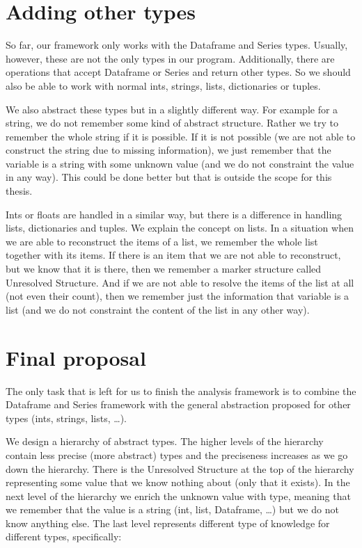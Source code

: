 \section{Adding other types}

So far, our framework only works with the Dataframe and Series types.
Usually, however, these are not the only types in our program.
Additionally, there are operations that accept Dataframe or Series and return other types.
So we should also be able to work with normal ints, strings, lists, dictionaries or tuples.

We also abstract these types but in a slightly different way.
For example for a string, we do not remember some kind of abstract structure.
Rather we try to remember the whole string if it is possible.
If it is not possible (we are not able to construct the string due to missing information), we just remember that the
variable is a string with some unknown value (and we do not constraint the value in any way).
This could be done better but that is outside the scope for this thesis.

Ints or floats are handled in a similar way, but there is a difference in handling lists, dictionaries and tuples.
We explain the concept on lists.
In a situation when we are able to reconstruct the items of a list, we remember the whole list together with its items.
If there is an item that we are not able to reconstruct, but we know that it is there, then we remember a marker
structure called Unresolved Structure.
And if we are not able to resolve the items of the list at all (not even their count), then we remember just the
information that variable is a list (and we do not constraint the content of the list in any other way).

\section{Final proposal}

The only task that is left for us to finish the analysis framework is to combine the Dataframe and Series framework
with the general abstraction proposed for other types (ints, strings, lists, \ldots).

We design a hierarchy of abstract types.
The higher levels of the hierarchy contain less precise (more abstract) types and the preciseness increases as we go
down the hierarchy.
There is the Unresolved Structure at the top of the hierarchy representing some value that we know nothing about (only
that it exists).
In the next level of the hierarchy we enrich the unknown value with type, meaning that we remember that the value
is a string (int, list, Dataframe, \ldots) but we do not know anything else.
The last level represents different type of knowledge for different types, specifically:

